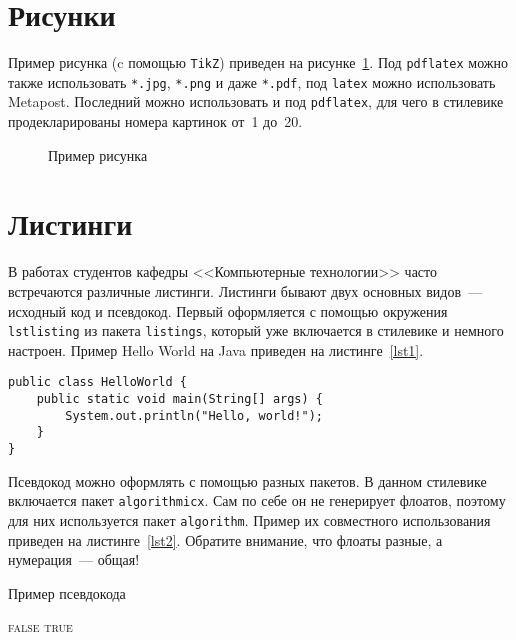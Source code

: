 \documentclass[annotation,times,page4]{itmo-student-thesis}
\begin{document}
\section{Рисунки}

Пример рисунка (c помощью \texttt{TikZ}) приведен на рисунке~\ref{fig1}. Под \texttt{pdflatex} можно также
использовать \texttt{*.jpg}, \texttt{*.png} и даже \texttt{*.pdf}, под \texttt{latex} можно использовать
Metapost. Последний можно использовать и под \texttt{pdflatex}, для чего в стилевике продекларированы
номера картинок от~1 до~20.

\begin{figure}[!h]
\caption{Пример рисунка}\label{fig1}
\centering
{}
\end{figure}

\section{Листинги}

В работах студентов кафедры <<Компьютерные технологии>> часто встречаются различные листинги. Листинги бывают
двух основных видов~--- исходный код и псевдокод. Первый оформляется с помощью окружения \texttt{lstlisting}
из пакета \texttt{listings}, который уже включается в стилевике и немного настроен. Пример Hello World на Java
приведен на листинге~\ref{lst1}.

\begin{lstlisting}[float=!h,caption={Пример исходного кода на Java},label={lst1}]
public class HelloWorld {
	public static void main(String[] args) {
		System.out.println("Hello, world!");
	}
}
\end{lstlisting}

Псевдокод можно оформлять с помощью разных пакетов. В данном стилевике включается пакет \texttt{algorithmicx}.
Сам по себе он не генерирует флоатов, поэтому для них используется пакет \texttt{algorithm}.
Пример их совместного использования приведен на листинге~\ref{lst2}. Обратите внимание, что флоаты разные, а 
нумерация~--- общая!

\begin{algorithm}[!h]
\caption{Пример псевдокода}\label{lst2}
\begin{algorithmic}
				\State\Return \textsc{false}
			\EndIf
		\EndFor
		\State\Return \textsc{true}
	\EndFunction
\end{algorithmic}
\end{algorithm}
\end{document}

